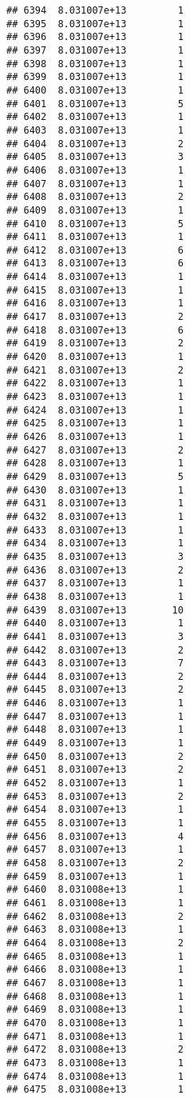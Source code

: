 \documentclass[
]{article}
\begin{document}
\begin{verbatim}
## 6394  8.031007e+13         1
## 6395  8.031007e+13         1
## 6396  8.031007e+13         1
## 6397  8.031007e+13         1
## 6398  8.031007e+13         1
## 6399  8.031007e+13         1
## 6400  8.031007e+13         1
## 6401  8.031007e+13         5
## 6402  8.031007e+13         1
## 6403  8.031007e+13         1
## 6404  8.031007e+13         2
## 6405  8.031007e+13         3
## 6406  8.031007e+13         1
## 6407  8.031007e+13         1
## 6408  8.031007e+13         2
## 6409  8.031007e+13         1
## 6410  8.031007e+13         5
## 6411  8.031007e+13         1
## 6412  8.031007e+13         6
## 6413  8.031007e+13         6
## 6414  8.031007e+13         1
## 6415  8.031007e+13         1
## 6416  8.031007e+13         1
## 6417  8.031007e+13         2
## 6418  8.031007e+13         6
## 6419  8.031007e+13         2
## 6420  8.031007e+13         1
## 6421  8.031007e+13         2
## 6422  8.031007e+13         1
## 6423  8.031007e+13         1
## 6424  8.031007e+13         1
## 6425  8.031007e+13         1
## 6426  8.031007e+13         1
## 6427  8.031007e+13         2
## 6428  8.031007e+13         1
## 6429  8.031007e+13         5
## 6430  8.031007e+13         1
## 6431  8.031007e+13         1
## 6432  8.031007e+13         1
## 6433  8.031007e+13         1
## 6434  8.031007e+13         1
## 6435  8.031007e+13         3
## 6436  8.031007e+13         2
## 6437  8.031007e+13         1
## 6438  8.031007e+13         1
## 6439  8.031007e+13        10
## 6440  8.031007e+13         1
## 6441  8.031007e+13         3
## 6442  8.031007e+13         2
## 6443  8.031007e+13         7
## 6444  8.031007e+13         2
## 6445  8.031007e+13         2
## 6446  8.031007e+13         1
## 6447  8.031007e+13         1
## 6448  8.031007e+13         1
## 6449  8.031007e+13         1
## 6450  8.031007e+13         2
## 6451  8.031007e+13         2
## 6452  8.031007e+13         1
## 6453  8.031007e+13         2
## 6454  8.031007e+13         1
## 6455  8.031007e+13         1
## 6456  8.031007e+13         4
## 6457  8.031007e+13         1
## 6458  8.031007e+13         2
## 6459  8.031007e+13         1
## 6460  8.031008e+13         1
## 6461  8.031008e+13         1
## 6462  8.031008e+13         2
## 6463  8.031008e+13         1
## 6464  8.031008e+13         2
## 6465  8.031008e+13         1
## 6466  8.031008e+13         1
## 6467  8.031008e+13         1
## 6468  8.031008e+13         1
## 6469  8.031008e+13         1
## 6470  8.031008e+13         1
## 6471  8.031008e+13         1
## 6472  8.031008e+13         2
## 6473  8.031008e+13         1
## 6474  8.031008e+13         1
## 6475  8.031008e+13         1

\end{verbatim}
\end{document}
